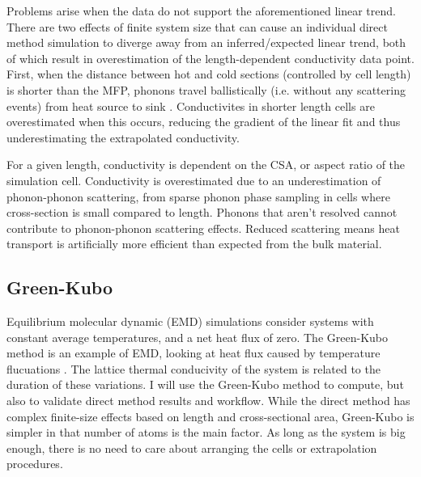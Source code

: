 Problems arise when the data do not support the aforementioned linear trend. There are two effects of finite system size that can cause an individual direct method simulation to diverge away from an inferred/expected linear trend, both of which result in overestimation of the length-dependent conductivity data point. First, when the distance between hot and cold sections (controlled by cell length) is shorter than the MFP, phonons travel ballistically (i.e. without any scattering events) from heat source to sink \citep{Sellan2010}. Conductivites in shorter length cells are overestimated when this occurs, reducing the gradient of the linear fit and thus underestimating the extrapolated conductivity.

For a given length, conductivity is dependent on the CSA, or aspect ratio of the simulation cell. Conductivity is overestimated due to an underestimation of phonon-phonon scattering, from sparse phonon phase sampling in cells where cross-section is small compared to length. Phonons that aren't resolved cannot contribute to phonon-phonon scattering effects. Reduced scattering means heat transport is artificially more efficient than expected from the bulk material. 




















\subsection{Green-Kubo}


Equilibrium molecular dynamic (EMD) simulations consider systems with constant average temperatures, and a net heat flux of zero. The Green-Kubo method is an example of EMD, looking at heat flux caused by temperature flucuations%
. The lattice thermal conducivity of the system is related to the duration of these variations. I will use the Green-Kubo method to compute, but also to validate direct method results and workflow.	While the direct method has complex finite-size effects based on length and cross-sectional area, Green-Kubo is simpler in that number of atoms is the main factor. As long as the system is big enough, there is no need to care about arranging the cells or extrapolation procedures.


